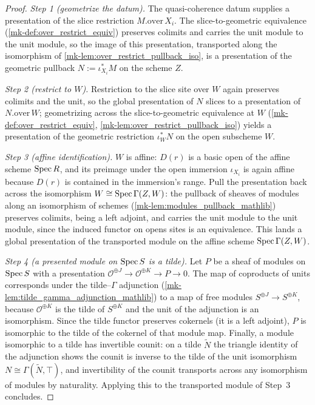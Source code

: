 \begin{proof}
  \leanok
  \emph{Step 1 (geometrize the datum).} The quasi-coherence datum supplies a presentation
  of the slice restriction \(M.\mathrm{over}\,X_i\). The slice-to-geometric equivalence
  (\ref{mk-def:over_restrict_equiv}) preserves colimits and carries the unit module to the
  unit module, so the image of this presentation, transported along the isomorphism of
  \ref{mk-lem:over_restrict_pullback_iso}, is a presentation of the geometric pullback
  \(N := \iota_{X_i}^{*} M\) on the scheme \(Z\).

  \emph{Step 2 (restrict to \(W\)).} Restriction to the slice site over \(W\) again
  preserves colimits and the unit, so the global presentation of \(N\) slices to a
  presentation of \(N.\mathrm{over}\,W\); geometrizing across the slice-to-geometric
  equivalence at \(W\) (\ref{mk-def:over_restrict_equiv},
  \ref{mk-lem:over_restrict_pullback_iso}) yields a presentation of the geometric
  restriction \(\iota_W^{*} N\) on the open subscheme \(W\).

  \emph{Step 3 (affine identification).} \(W\) is affine: \(D(r)\) is a basic open of the
  affine scheme \(\operatorname{Spec} R\), and its preimage under the open immersion \(\iota_{X_i}\) is
  again affine because \(D(r)\) is contained in the immersion's range. Pull the
  presentation back across the isomorphism \(W \cong \operatorname{Spec}\Gamma(Z, W)\): the pullback of
  sheaves of modules along an isomorphism of schemes
  (\ref{mk-lem:modules_pullback_mathlib}) preserves colimits, being a left adjoint, and
  carries the unit module to the unit module, since the induced functor on opens sites is
  an equivalence. This lands a global presentation of the transported module on the
  affine scheme \(\operatorname{Spec}\Gamma(Z, W)\).

  \emph{Step 4 (a presented module on \(\operatorname{Spec} S\) is a tilde).} Let \(P\) be a sheaf of
  modules on \(\operatorname{Spec} S\) with a presentation
  \(\mathcal{O}^{\oplus J} \to \mathcal{O}^{\oplus K} \to P \to 0\). The map of coproducts
  of units corresponds under the tilde--\(\Gamma\) adjunction
  (\ref{mk-lem:tilde_gamma_adjunction_mathlib}) to a map of free modules
  \(S^{\oplus J} \to S^{\oplus K}\), because \(\mathcal{O}^{\oplus K}\) is the tilde of
  \(S^{\oplus K}\) and the unit of the adjunction is an isomorphism. Since the tilde
  functor preserves cokernels (it is a left adjoint), \(P\) is isomorphic to the tilde of
  the cokernel of that module map. Finally, a module isomorphic to a tilde has invertible
  counit: on a tilde \(\widetilde{N}\) the triangle identity of the adjunction shows the
  counit is inverse to the tilde of the unit isomorphism \(N \cong
  \Gamma(\widetilde{N}, \top)\), and invertibility of the counit transports across any
  isomorphism of modules by naturality. Applying this to the transported module of
  Step~3 concludes.
\end{proof}

